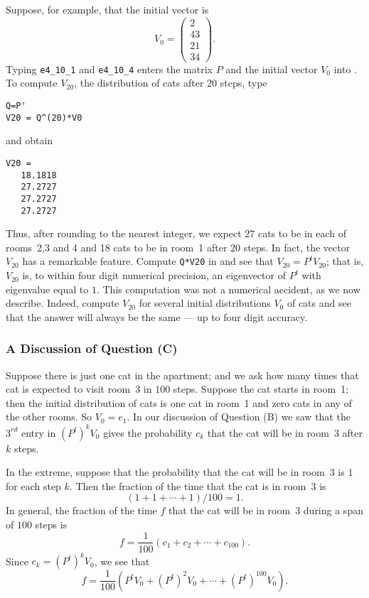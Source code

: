 Suppose, for example, that the initial vector is
\begin{equation*}
V_0 =\left(\begin{array}{c} 2 \\ 43 \\ 21 \\ 34 \end{array}\right).
\end{equation*}
Typing {\tt e4\_10\_1} and {\tt e4\_10\_4} enters the matrix $P$ and the
initial vector $V_0$ into \Matlabp.  To compute $V_{20}$, the distribution
of cats after $20$ steps, type
\begin{verbatim}
Q=P'
V20 = Q^(20)*V0
\end{verbatim}
and obtain
\begin{verbatim}
V20 =
   18.1818
   27.2727
   27.2727
   27.2727
\end{verbatim}
Thus, after rounding to the nearest integer, we expect $27$ cats to be in
each of rooms~2,3 and 4 and 18 cats to be in room~1 after $20$ steps.  In
fact, the vector $V_{20}$
has a remarkable feature.  Compute {\tt Q*V20} in \Matlab and see that
$V_{20} = P^tV_{20}$; that is, $V_{20}$ is, to within four digit numerical
precision, an eigenvector of $P^t$ with eigenvalue equal to $1$.  This
computation was not a numerical accident, as we now describe.  Indeed,
compute $V_{20}$ for several initial distributions $V_0$ of cats and see that
the answer will always be the same --- up to four digit accuracy.

\subsubsection*{A Discussion of Question (C)}

Suppose there is just one cat in the apartment; and we ask how many times that
cat is expected to visit room~3 in $100$ steps.  Suppose the cat starts in
room~1; then the initial distribution of cats is one cat in room~1 and zero
cats in any of the other rooms.  So $V_0=e_1$.  In our discussion of
Question (B) we saw that the $3^{rd}$ entry in $(P^t)^kV_0$ gives the
probability $c_k$ that the cat will be in room~3 after $k$ steps.

In the extreme, suppose that the probability that the cat will be in room~3 is
$1$ for each step $k$.  Then the fraction of the time that the cat is in room~3
is
\[
(1 + 1 + \cdots + 1)/100 = 1.
\]
In general, the fraction of the time $f$ that the cat will be in room~3
during a span of $100$ steps is
\[
f = \frac{1}{100}(c_1 + c_2 +\cdots + c_{100}).
\]
Since $c_k = (P^t)^kV_0$, we see that
\begin{equation}  \label{E:f}
f = \frac{1}{100}(P^tV_0 + (P^t)^2V_0 + \cdots + (P^t)^{100}V_0).
\end{equation}

